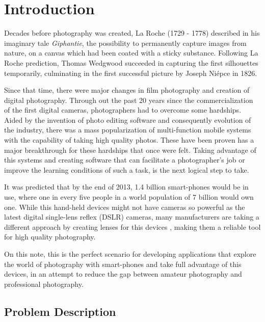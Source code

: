 % 
%  
%
\chapter{Introduction}
\label{cha:intro}

Decades before photography was created, La Roche (1729 - 1778) described in his imaginary tale \emph{Giphantie}, the possibility to permanently capture images from nature, on a canvas which had been coated with a sticky substance. Following La Roche prediction, Thomas Wedgwood succeeded in capturing the first silhouettes temporarily, culminating in the first successful picture by Joseph Niépce in 1826. \cite{Leggat1995}

Since that time, there were major changes in film photography and creation of digital photography. Through out the past 20 years since the commercialization of the first digital cameras, photographers had to overcome some hardships.
Aided by the invention of photo editing software and consequently evolution of the industry, there was a mass popularization of multi-function mobile systems with the capability of taking high quality photos. These have been proven has a major breakthrough for these hardships that once were felt.
Taking advantage of this systems and creating software that can facilitate a photographer's job or improve the learning conditions of such a task, is the next logical step to take.

It was predicted that by the end of 2013, 1.4 billion smart-phones would be in use, where one in every five people in a world population of 7 billion would own one.\cite{Leonard2013} While this hand-held devices might not have cameras so powerful as the latest digital single-lens reflex (DSLR) cameras, many manufacturers are taking a different approach by creating lenses for this devices \cite{Bolton2013}, making them a reliable tool for high quality photography.

On this note, this is the perfect scenario for developing applications that explore the world of photography with smart-phones and take full advantage of this devices, in an attempt to reduce the gap between amateur photography and professional photography.

\section{Problem Description}

